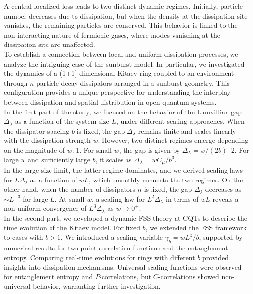     A central localized loss leads to two distinct dynamic regimes. Initially, particle number decreases due to dissipation, but when the density at the dissipation site vanishes, the remaining particles are conserved. This behavior is linked to the non-interacting nature of fermionic gases, where modes vanishing at the dissipation site are unaffected.
    \\$ $\\
    To establish a connection between local and uniform dissipation processes, we analyze the intriguing case of the sunburst model.
    In particular, we investigated the dynamics of a (1+1)-dimensional Kitaev ring coupled to an environment through \( n \) particle-decay dissipators arranged in a sunburst geometry. This configuration provides a unique perspective for understanding the interplay between dissipation and spatial distribution in open quantum systems.\\
    In the first part of the study, we focused on the behavior of the Liouvillian gap \( \Delta_\lambda \) as a function of the system size \( L \), under different scaling approaches. When the dissipator spacing \( b \) is fixed, the gap \( \Delta_\lambda \) remains finite and scales linearly with the dissipation strength \( w \). However, two distinct regimes emerge depending on the magnitude of \( w \): 
    1. For small \( w \), the gap is given by \( \Delta_\lambda = w/(2b) \).
    2. For large \( w \) and sufficiently large \( b \), it scales as \( \Delta_\lambda = wC_\mu/b^3 \).\\
    In the large-size limit, the latter regime dominates, and we derived scaling laws for \( L\Delta_\lambda \) as a function of \( wL \), which smoothly connects the two regimes. On the other hand, when the number of dissipators \( n \) is fixed, the gap \( \Delta_\lambda \) decreases as \( \sim L^{-3} \) for large \( L \). At small \( w \), a scaling law for \( L^2\Delta_\lambda \) in terms of \( wL \) reveals a non-uniform convergence of \( L^3\Delta_\lambda \) as \( w \to 0^+ \).\\
    In the second part, we developed a dynamic FSS theory at CQTs to describe the time evolution of the Kitaev model. For fixed \( b \), we extended the FSS framework to cases with \( b > 1 \). We introduced a scaling variable \( \gamma_b = wL^z/b \), supported by numerical results for two-point correlation functions and the entanglement entropy. Comparing real-time evolutions for rings with different \( b \) provided insights into dissipation mechanisms. Universal scaling functions were observed for entanglement entropy and \( P \)-correlations, but \( C \)-correlations showed non-universal behavior, warranting further investigation.\\
